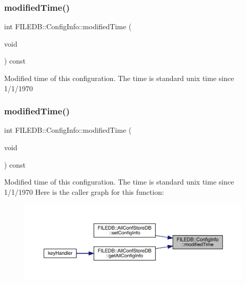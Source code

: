 \subsubsection{\texorpdfstring{modifiedTime()}{modifiedTime()}\hspace{0.1cm}{\footnotesize\ttfamily [1/6]}}
{\footnotesize\ttfamily int F\+I\+L\+E\+D\+B\+::\+Config\+Info\+::modified\+Time (\begin{DoxyParamCaption}\item[{void}]{ }\end{DoxyParamCaption}) const}

Modified time of this configuration. The time is standard unix time since 1/1/1970 \mbox{\label{classFILEDB_1_1ConfigInfo_a03212f15d26edbae21ea53bbce2b1793}} 
\subsubsection{\texorpdfstring{modifiedTime()}{modifiedTime()}\hspace{0.1cm}{\footnotesize\ttfamily [2/6]}}
{\footnotesize\ttfamily int F\+I\+L\+E\+D\+B\+::\+Config\+Info\+::modified\+Time (\begin{DoxyParamCaption}\item[{void}]{ }\end{DoxyParamCaption}) const}

Modified time of this configuration. The time is standard unix time since 1/1/1970 Here is the caller graph for this function\+:
\nopagebreak
\begin{figure}[H]
\begin{center}
\leavevmode
\includegraphics[width=350pt]{d0/d90/classFILEDB_1_1ConfigInfo_a03212f15d26edbae21ea53bbce2b1793_icgraph}
\end{center}
\end{figure}
\mbox{\label{classFILEDB_1_1ConfigInfo_a03212f15d26edbae21ea53bbce2b1793}} 
